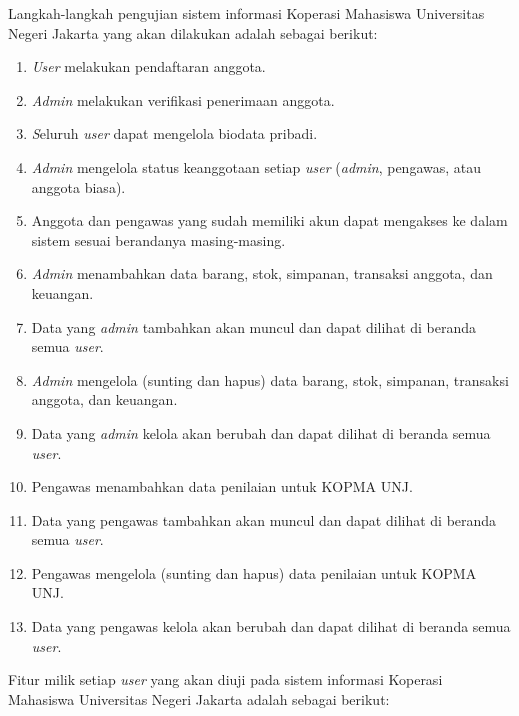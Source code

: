 Langkah-langkah pengujian sistem informasi Koperasi Mahasiswa Universitas Negeri Jakarta yang akan dilakukan adalah sebagai berikut:
\begin{enumerate}
	\item \textit{User} melakukan pendaftaran anggota.
	\item \textit{Admin} melakukan verifikasi penerimaan anggota.
	\item \textit Seluruh \textit{user} dapat mengelola biodata pribadi.
	\item \textit{Admin} mengelola status keanggotaan setiap \textit{user} (\textit{admin}, pengawas, atau anggota biasa).
	\item Anggota dan pengawas yang sudah memiliki akun dapat mengakses ke dalam sistem sesuai berandanya masing-masing.
	\item \textit{Admin} menambahkan data barang, stok, simpanan, transaksi anggota, dan keuangan.
	\item Data yang \textit{admin} tambahkan akan muncul dan dapat dilihat di beranda semua \textit{user}.
	\item \textit{Admin} mengelola (sunting dan hapus) data barang, stok, simpanan, transaksi anggota, dan keuangan.
	\item Data yang \textit{admin} kelola akan berubah dan dapat dilihat di beranda semua \textit{user}.	
	\item Pengawas menambahkan data penilaian untuk KOPMA UNJ.
	\item Data yang pengawas tambahkan akan muncul dan dapat dilihat di beranda  semua \textit{user}.
	\item Pengawas mengelola (sunting dan hapus) data penilaian untuk KOPMA UNJ.
	\item Data yang pengawas kelola akan berubah dan dapat dilihat di beranda semua \textit{user}.	
\end{enumerate}

Fitur milik setiap \textit{user} yang akan diuji pada sistem informasi Koperasi Mahasiswa Universitas Negeri Jakarta adalah sebagai berikut:

